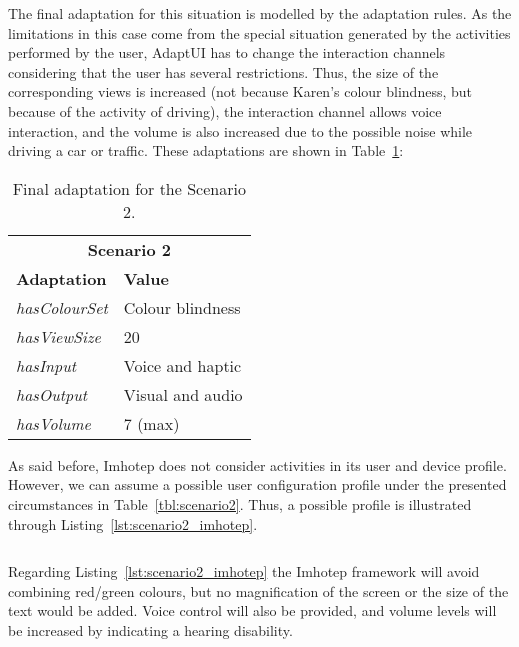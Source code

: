 The final adaptation for this situation is modelled by the adaptation rules.
As the limitations in this case come from the special situation generated by 
the activities performed by the user, AdaptUI has to change the interaction 
channels considering that the user has several restrictions. Thus, the size of 
the corresponding views is increased (not because Karen's colour blindness, but
because of the activity of driving), the interaction channel allows voice 
interaction, and the volume is also increased due to the possible noise while
driving a car or traffic. These adaptations are shown in 
Table~\ref{tbl:final_adaptation_scenario2}:

\begin{table}
 \caption{Final adaptation for the Scenario 2.}
 \label{tbl:final_adaptation_scenario2}
 \footnotesize
 \centering
\begin{tabular}{l l}
  \hline 
    \multicolumn{2}{c}{\textbf{Scenario 2}}		\\
    \textbf{Adaptation} 	& \textbf{Value} 	\\
    \hline
    \textit{hasColourSet}	& Colour blindness 	\\
    \textit{hasViewSize}	& 20 			\\
    \textit{hasInput}		& Voice and haptic	\\
    \textit{hasOutput}		& Visual and audio	\\
    \textit{hasVolume}		& 7 (max) 		\\
  \hline
\end{tabular}
\end{table}

As said before, Imhotep does not consider activities in its user and device 
profile. However, we can assume a possible user configuration profile under the 
presented circumstances in Table~\ref{tbl:scenario2}. Thus, a possible profile
is illustrated through Listing~\ref{lst:scenario2_imhotep}.


\inputminted[linenos=true, fontsize=\footnotesize, frame=lines]{json}{5_experiments_and_results/scenario2_imhotep.json}


Regarding Listing~\ref{lst:scenario2_imhotep} the Imhotep framework will avoid
combining red/green colours, but no magnification of the screen or the size
of the text would be added. Voice control will also be provided, and volume
levels will be increased by indicating a hearing disability.



